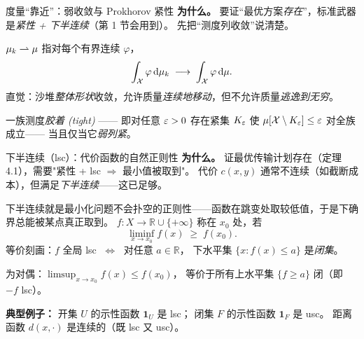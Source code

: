 \begin{frame}{度量“靠近”：弱收敛与 Prokhorov 紧性}
  \textbf{为什么。} 要证“最优方案\emph{存在}”，标准武器是\emph{紧性 + 下半连续}（第 1 节会用到）。
  先把“测度列收敛”说清楚。

  \medskip
   $\mu_k\rightharpoonup\mu$ 指对每个有界连续 $\varphi$，
  \[
    \int_{\mathcal{X}} \varphi\,\mathrm{d}\mu_k \;\longrightarrow\; \int_{\mathcal{X}} \varphi\,\mathrm{d}\mu .
  \]
  直觉：沙堆\emph{整体形状}收敛，允许质量\emph{连续地移动}，但不允许质量\emph{逃逸到无穷}。

  \medskip
   一族测度\emph{胶着 (tight)} ——
  即对任意 $\varepsilon>0$ 存在紧集 $K_\varepsilon$ 使 $\mu[\mathcal{X}\setminus K_\varepsilon]\le\varepsilon$ 对全族成立——
  当且仅当它\emph{弱列紧}。
\end{frame}

\begin{frame}{下半连续（lsc）：代价函数的自然正则性}
  \textbf{为什么。} 证最优传输计划存在（定理 4.1），需要"紧性 + lsc $\Rightarrow$ 最小值被取到"。
  代价 $c(x,y)$ 通常不连续（如截断成本），但满足\emph{下半连续}——这已足够。

   下半连续就是最小化问题不会扑空的正则性——函数在跳变处取较低值，于是下确界总能被某点真正取到。
   $f:X\to\mathbb{R}\cup\{+\infty\}$
  称在 $x_0$ 处，若
  \[
    \liminf_{x\to x_0}f(x) \;\ge\; f(x_0).
  \]
  等价刻画：$f$ 全局 lsc $\;\Longleftrightarrow\;$ 对任意 $a\in\mathbb{R}$，
  下水平集 $\{x: f(x)\le a\}$ 是\emph{闭集}。

   为对偶：$\limsup_{x\to x_0}f(x)\le f(x_0)$，
  等价于所有上水平集 $\{f\ge a\}$ 闭（即 $-f$ lsc）。

  \textbf{典型例子：} 开集 $U$ 的示性函数 $\mathbf{1}_{U}$ 是 lsc；
  闭集 $F$ 的示性函数 $\mathbf{1}_{F}$ 是 usc。
  距离函数 $d(x,\cdot)$ 是连续的（既 lsc 又 usc）。

  \vspace{-3pt}
\end{frame}


